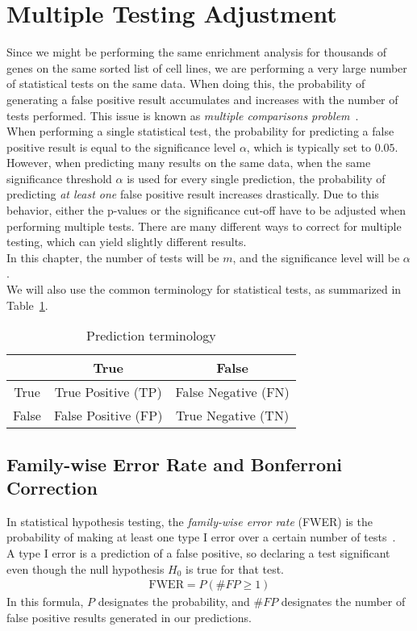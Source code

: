 \section{Multiple Testing Adjustment}\label{sec:multi-testing}

Since we might be performing the same enrichment analysis for thousands of genes on the same sorted list of cell lines, we are performing a very large number of statistical tests on the same data. When doing this, the probability of generating a false positive result accumulates and increases with the number of tests performed. This issue is known as \textit{multiple comparisons problem}~\cite{benjamini_hochberg}.\\
When performing a single statistical test, the probability for predicting a false positive result is equal to the significance level $\alpha$, which is typically set to $0.05$. However, when predicting many results on the same data, when the same significance threshold $\alpha$ is used for every single prediction, the probability of predicting \textit{at least one} false positive result increases drastically. Due to this behavior, either the p-values or the significance cut-off have to be adjusted when performing multiple tests. There are many different ways to correct for multiple testing, which can yield slightly different results.\\
In this chapter, the number of tests will be $m$, and the significance level will be $\alpha$.\\
We will also use the common terminology for statistical tests, as summarized in Table~\ref{table:truefalse}.
\begin{table}
\begin{tabular}{|c|cc|}
	\hline
	\diagbox{truth}{prediction}&True&False\\
	\hline
	True&True Positive (TP)&False Negative (FN)\\
	False&False Positive (FP)&True Negative (TN)\\
	\hline
\end{tabular}
\caption{Prediction terminology}
\label{table:truefalse}
\end{table}

\subsection{Family-wise Error Rate and Bonferroni Correction}\label{subsec:mutli_bonferroni}
In statistical hypothesis testing, the \emph{family-wise error rate} (FWER) is the probability of making at least one type I error over a certain number of tests~\cite{FWER}.\\
A type I error is a prediction of a false positive, so declaring a test significant even though the null hypothesis $H_0$ is true for that test.
\begin{align}
	\text{FWER} = P(\#FP \geq 1)
\end{align}
In this formula, $P$ designates the probability, and $\#FP$ designates the number of false positive results generated in our predictions.

